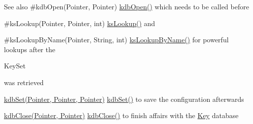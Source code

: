\begin{DoxySeeAlso}{See also}
\#kdb\+Open(\+Pointer, Pointer) \hyperlink{interfaceorg_1_1libelektra_1_1Elektra_a32639cf92429fe65bf3744a007d8647f}{kdb\+Open()} which needs to be called before 

\#ks\+Lookup(\+Pointer, Pointer, int) \hyperlink{group__keyset_ga60f1ddcf23272f2b29b90e92ebe9b56f}{ks\+Lookup()} and 

\#ks\+Lookup\+By\+Name(\+Pointer, String, int) \hyperlink{group__keyset_gad65d2cdcbb5381194a1688e169af8a83}{ks\+Lookup\+By\+Name()} for powerful lookups after the
\begin{DoxyCode}
KeySet 
\end{DoxyCode}
 was retrieved 

\hyperlink{interfaceorg_1_1libelektra_1_1Elektra_a7b69b22fd8b712891d188215707e0540}{kdb\+Set(\+Pointer, Pointer, Pointer)} \hyperlink{interfaceorg_1_1libelektra_1_1Elektra_a7b69b22fd8b712891d188215707e0540}{kdb\+Set()} to save the configuration afterwards 

\hyperlink{interfaceorg_1_1libelektra_1_1Elektra_a60cf0c7cefd0a6a34b4608bdc5eded4b}{kdb\+Close(\+Pointer, Pointer)} \hyperlink{interfaceorg_1_1libelektra_1_1Elektra_a60cf0c7cefd0a6a34b4608bdc5eded4b}{kdb\+Close()} to finish affairs with the \hyperlink{group__key}{Key} database
\end{DoxySeeAlso}

